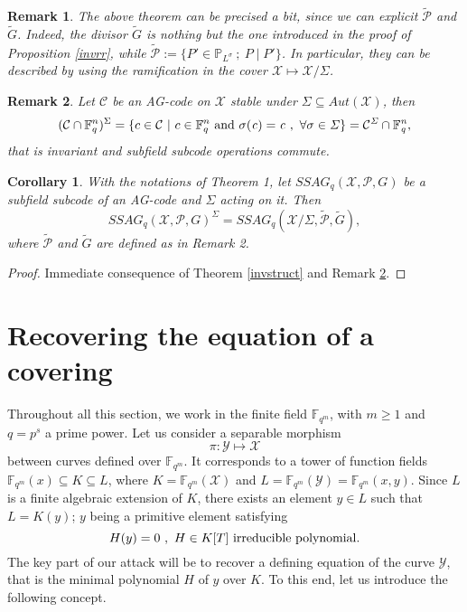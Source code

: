 \documentclass[10pt]{article}
\newtheorem{coro1}{Corollary}[]
\newtheorem{rq1}{Remark}[]
\newcommand{\s}{\vspace{0.3cm}}
\newcommand{\fqm}{\mathbb{F}_{q^m}}
\newcommand{\fq}{\mathbb{F}_q}
\newcommand{\su}{\subseteq}
\newcommand{\X}{\mathcal{X}}
\newcommand{\Y}{\mathcal{Y}}
\newcommand{\PR}{\mathcal{P}}
\begin{document}
\s


\begin{rq1} \rm
The above theorem can be precised a bit, since we can explicit $\tilde{\PR}$ and $\tilde{G}$. Indeed, the divisor $\tilde{G}$ is nothing but the one introduced in the proof of Proposition \ref{invrr}, while $\tilde{\PR} := \{P' \in \mathbb{P}_{L^{\sigma}} \ ; \ P \mid P'\}$. In particular, they can be described by using the ramification in the cover $\X \longmapsto \X/\Sigma$.
\end{rq1}

\s

\begin{rq1} \rm \label{commute}
Let $\mathcal{C}$ be an AG-code on $\X$ stable under $\Sigma \su Aut(\X)$, then
\[(\mathcal{C}\cap \fq^n)^{\Sigma} = \{c \in \mathcal{C} \ | \ c \in \fq^n \ \rm and \it \ \sigma(c)=c \ , \ \forall \sigma \in \Sigma\} = \mathcal{C}^{\Sigma} \cap \fq^n,\]
that is invariant and subfield subcode operations commute.
\end{rq1}

\s

\begin{coro1} \label{ssag}
With the notations of Theorem 1, let $SSAG_q(\X,\PR,G)$ be a subfield subcode of an AG-code and $\Sigma$ acting on it. Then 
\[SSAG_q(\X,\PR,G)^{\Sigma} = SSAG_q(\X/\Sigma,\tilde{\PR},\tilde{G}),\]
where $\tilde{\PR}$ and $\tilde{G}$ are defined as in Remark \rm 2.
\end{coro1}

\s

\begin{proof}
Immediate consequence of Theorem \ref{invstruct} and Remark \ref{commute}.
\end{proof}

\s

\section{Recovering the equation of a covering}


\s

Throughout all this section, we work in the finite field $\fqm$, with $m\geq 1$ and $q=p^s$ a prime power. Let us consider a separable morphism 
\[\pi : \Y \longmapsto \X\]
between curves defined over $\fqm$. It corresponds to a tower of function fields $\fqm(x) \su K \su L$, where $K=\fqm(\X)$ and $L=\fqm(\Y)=\fqm(x,y)$. Since $L$ is a finite  algebraic extension of $K$, there exists an element $y \in L$ such that $L=K(y)$; $y$ being a primitive element satisfying
\[ H(y)=0 \ , \ H \in K[T] \ \rm irreducible \ polynomial.\]
The key part of our attack will be to recover a defining equation of the curve $\Y$, that is the minimal polynomial $H$ of $y$ over $K$. To this end, let us introduce the following concept.
\end{document}
